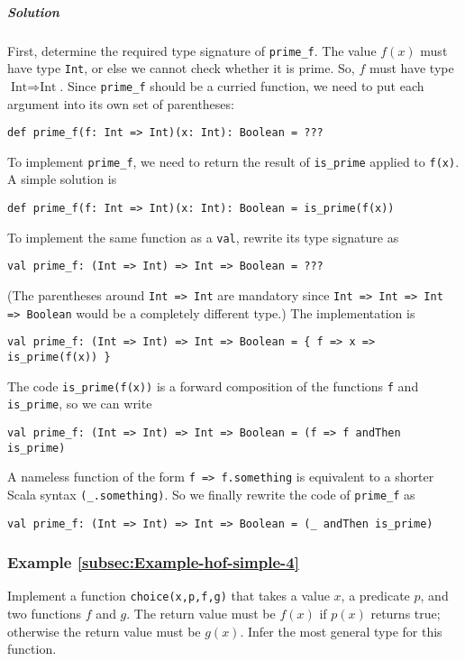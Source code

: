 \subparagraph{Solution}

First, determine the required type signature of \lstinline!prime_f!.
The value $f(x)$ must have type \lstinline!Int!, or else we cannot
check whether it is prime. So, $f$ must have type $\text{Int}\Rightarrow\text{Int}$.
Since \lstinline!prime_f! should be a curried function, we need to
put each argument into its own set of parentheses:
\begin{lstlisting}
def prime_f(f: Int => Int)(x: Int): Boolean = ???
\end{lstlisting}
To implement \lstinline!prime_f!, we need to return the result of
\lstinline!is_prime! applied to \lstinline!f(x)!. A simple solution
is
\begin{lstlisting}
def prime_f(f: Int => Int)(x: Int): Boolean = is_prime(f(x))
\end{lstlisting}

To implement the same function as a \lstinline!val!, rewrite its
type signature as
\begin{lstlisting}
val prime_f: (Int => Int) => Int => Boolean = ???
\end{lstlisting}
(The parentheses around \lstinline!Int => Int! are mandatory since
\lstinline!Int => Int => Int => Boolean! would be a completely different
type.) The implementation is
\begin{lstlisting}
val prime_f: (Int => Int) => Int => Boolean = { f => x => is_prime(f(x)) }
\end{lstlisting}
The code \lstinline!is_prime(f(x))! is a forward composition of the
functions \lstinline!f! and \lstinline!is_prime!, so we can write
\begin{lstlisting}
val prime_f: (Int => Int) => Int => Boolean = (f => f andThen is_prime)
\end{lstlisting}
A nameless function of the form \lstinline!f => f.something! is equivalent
to a shorter Scala syntax \lstinline!(_.something)!. So we finally
rewrite the code of \lstinline!prime_f! as
\begin{lstlisting}
val prime_f: (Int => Int) => Int => Boolean = (_ andThen is_prime)
\end{lstlisting}


\subsubsection{Example \label{subsec:Example-hof-simple-4}\ref{subsec:Example-hof-simple-4}}

Implement a function \lstinline!choice(x,p,f,g)! that takes a value
$x$, a predicate $p$, and two functions $f$ and $g$. The return
value must be $f(x)$ if $p(x)$ returns true; otherwise the return
value must be $g(x)$. Infer the most general type for this function.

